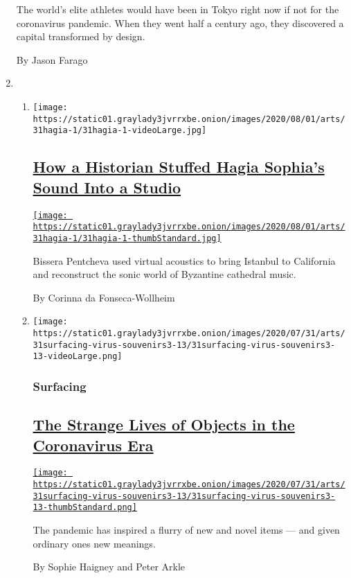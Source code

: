 \begin{enumerate}
  The world's elite athletes would have been in Tokyo right now if not
  for the coronavirus pandemic. When they went half a century ago, they
  discovered a capital transformed by design.

  By Jason Farago
\item
  \begin{enumerate}
  \def\labelenumii{\arabic{enumii}.}
  \item
    \texttt{[image: https://static01.graylady3jvrrxbe.onion/images/2020/08/01/arts/31hagia-1/31hagia-1-videoLarge.jpg]}

    \hypertarget{how-a-historian-stuffed-hagia-sophias-sound-into-a-studio}{%
    \subsection{\texorpdfstring{\href{/2020/07/30/arts/music/hagia-sophia-acoustics-music.html}{How
    a Historian Stuffed Hagia Sophia's Sound Into a
    Studio}}{How a Historian Stuffed Hagia Sophia's Sound Into a Studio}}\label{how-a-historian-stuffed-hagia-sophias-sound-into-a-studio}}

    \href{/2020/07/30/arts/music/hagia-sophia-acoustics-music.html}{\texttt{[image: https://static01.graylady3jvrrxbe.onion/images/2020/08/01/arts/31hagia-1/31hagia-1-thumbStandard.jpg]}}

    Bissera Pentcheva used virtual acoustics to bring Istanbul to
    California and reconstruct the sonic world of Byzantine cathedral
    music.

    By Corinna da Fonseca-Wollheim
  \item
    \texttt{[image: https://static01.graylady3jvrrxbe.onion/images/2020/07/31/arts/31surfacing-virus-souvenirs3-13/31surfacing-virus-souvenirs3-13-videoLarge.png]}

    \hypertarget{surfacing}{%
    \subsubsection{Surfacing}\label{surfacing}}

    \hypertarget{the-strange-lives-of-objects-in-the-coronavirus-era}{%
    \subsection{\texorpdfstring{\href{/2020/08/01/arts/design/virus-design-objects.html}{The
    Strange Lives of Objects in the Coronavirus
    Era}}{The Strange Lives of Objects in the Coronavirus Era}}\label{the-strange-lives-of-objects-in-the-coronavirus-era}}

    \href{/2020/08/01/arts/design/virus-design-objects.html}{\texttt{[image: https://static01.graylady3jvrrxbe.onion/images/2020/07/31/arts/31surfacing-virus-souvenirs3-13/31surfacing-virus-souvenirs3-13-thumbStandard.png]}}

    The pandemic has inspired a flurry of new and novel items --- and
    given ordinary ones new meanings.

    By Sophie Haigney and Peter Arkle
  \end{enumerate}
\end{enumerate}

